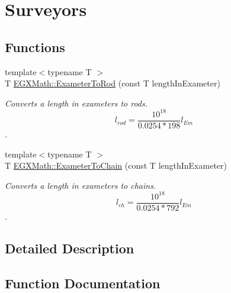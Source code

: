 \hypertarget{group___e_g_x_math-_conversions-_length_conversions-_s_i-_exameter-_surveyors}{}\section{Surveyors}
\label{group___e_g_x_math-_conversions-_length_conversions-_s_i-_exameter-_surveyors}
\subsection*{Functions}
\begin{DoxyCompactItemize}
\item 
{\footnotesize template$<$typename T $>$ }\\T \mbox{\hyperlink{group___e_g_x_math-_conversions-_length_conversions-_s_i-_exameter-_surveyors_ga5d842e19237d7aecc7d5c2428e4ac434}{E\+G\+X\+Math\+::\+Exameter\+To\+Rod}} (const T length\+In\+Exameter)
\begin{DoxyCompactList}\small\item\em Converts a length in exameters to rods. \[ l_{rod}= \frac{10^{18}}{0.0254 * 198} l_{Em} \]. \end{DoxyCompactList}\item 
{\footnotesize template$<$typename T $>$ }\\T \mbox{\hyperlink{group___e_g_x_math-_conversions-_length_conversions-_s_i-_exameter-_surveyors_ga2d85311f9e75da9c0f753ed578992d10}{E\+G\+X\+Math\+::\+Exameter\+To\+Chain}} (const T length\+In\+Exameter)
\begin{DoxyCompactList}\small\item\em Converts a length in exameters to chains. \[ l_{ch}= \frac{10^{18}}{0.0254 * 792} l_{Em} \]. \end{DoxyCompactList}\end{DoxyCompactItemize}


\subsection{Detailed Description}


\subsection{Function Documentation}
\mbox{\label{group___e_g_x_math-_conversions-_length_conversions-_s_i-_exameter-_surveyors_ga2d85311f9e75da9c0f753ed578992d10}} 
